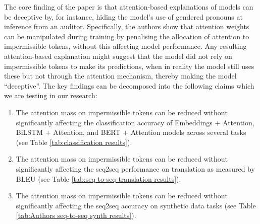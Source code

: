 


The core finding of the paper is that attention-based explanations of models can be deceptive by, for instance, hiding the model’s use of gendered pronouns at inference from an auditor. Specifically, the authors show that attention weights can be manipulated during training by penalising the allocation of attention to impermissible tokens, without this affecting model performance. Any resulting attention-based explanation might suggest that the model did not rely on impermissible tokens to make its predictions, when in reality the model still uses these but not through the attention mechanism, thereby making the model ``deceptive''. The key findings can be decomposed into the following claims which we are testing in our research:

\begin{enumerate}
    \item The attention mass on impermissible tokens can be reduced without significantly affecting the classification accuracy of Embeddings + Attention, BiLSTM + Attention, and BERT + Attention models across several tasks (see Table \ref{tab:classification results}).
    \item The attention mass on impermissible tokens can be reduced without significantly affecting the seq2seq performance on translation as measured by BLEU (see Table \ref{tab:seq-to-seq translation results}).
    \item The attention mass on impermissible tokens can be reduced without significantly affecting the seq2seq accuracy on synthetic data tasks (see Table \ref{tab:Authors seq-to-seq synth results}).
\end{enumerate}

